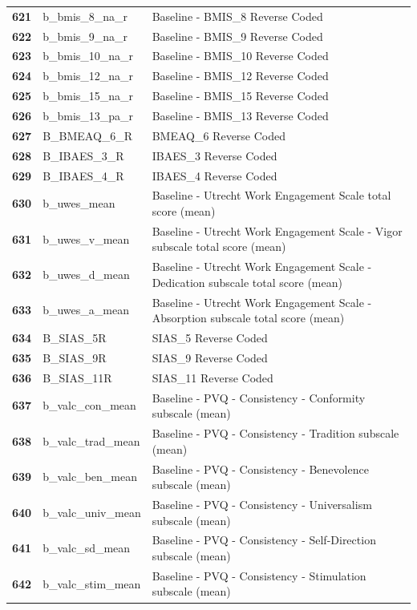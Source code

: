 \documentclass[
  letterpaper,
  DIV=11,
  numbers=noendperiod]{scrartcl}
\begin{document}
\begin{longtable}[t]{>{}cll}
\addlinespace
\textbf{621} & b\_bmis\_8\_na\_r & Baseline - BMIS\_8 Reverse Coded\\
\textbf{622} & b\_bmis\_9\_na\_r & Baseline - BMIS\_9 Reverse Coded\\
\textbf{623} & b\_bmis\_10\_na\_r & Baseline - BMIS\_10 Reverse Coded\\
\textbf{624} & b\_bmis\_12\_na\_r & Baseline - BMIS\_12 Reverse Coded\\
\textbf{625} & b\_bmis\_15\_na\_r & Baseline - BMIS\_15 Reverse Coded\\
\addlinespace
\textbf{626} & b\_bmis\_13\_pa\_r & Baseline - BMIS\_13 Reverse Coded\\
\textbf{627} & B\_BMEAQ\_6\_R & BMEAQ\_6 Reverse Coded\\
\textbf{628} & B\_IBAES\_3\_R & IBAES\_3 Reverse Coded\\
\textbf{629} & B\_IBAES\_4\_R & IBAES\_4 Reverse Coded\\
\textbf{630} & b\_uwes\_mean & Baseline - Utrecht Work Engagement Scale total score (mean)\\
\addlinespace
\textbf{631} & b\_uwes\_v\_mean & Baseline - Utrecht Work Engagement Scale - Vigor subscale total score (mean)\\
\textbf{632} & b\_uwes\_d\_mean & Baseline - Utrecht Work Engagement Scale - Dedication subscale total score (mean)\\
\textbf{633} & b\_uwes\_a\_mean & Baseline - Utrecht Work Engagement Scale - Absorption subscale total score (mean)\\
\textbf{634} & B\_SIAS\_5R & SIAS\_5 Reverse Coded\\
\textbf{635} & B\_SIAS\_9R & SIAS\_9 Reverse Coded\\
\addlinespace
\textbf{636} & B\_SIAS\_11R & SIAS\_11 Reverse Coded\\
\textbf{637} & b\_valc\_con\_mean & Baseline - PVQ - Consistency - Conformity subscale (mean)\\
\textbf{638} & b\_valc\_trad\_mean & Baseline - PVQ - Consistency - Tradition subscale (mean)\\
\textbf{639} & b\_valc\_ben\_mean & Baseline - PVQ - Consistency - Benevolence subscale (mean)\\
\textbf{640} & b\_valc\_univ\_mean & Baseline - PVQ - Consistency - Universalism subscale (mean)\\
\addlinespace
\textbf{641} & b\_valc\_sd\_mean & Baseline - PVQ - Consistency - Self-Direction subscale (mean)\\
\textbf{642} & b\_valc\_stim\_mean & Baseline - PVQ - Consistency - Stimulation subscale (mean)\\

\end{longtable}
\end{document}
